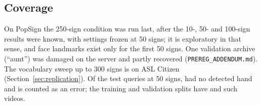 

\subsection{Coverage}
On PopSign the 250-sign condition was run last, after the 10-, 50- and 100-sign results were known, with settings frozen at 50 signs; it is exploratory in that sense, and face landmarks exist only for the first 50 signs. One validation archive (``aunt'') was damaged on the server and partly recovered (\texttt{PREREG\_ADDENDUM.md}). The vocabulary sweep up to 300 signs is on ASL Citizen
(Section~\ref{sec:replication}). Of the \nVideosTest{} test queries at 50 signs,
\nNoHandTest{} had no detected hand and is counted as an error; the training and validation splits have \nNoHandTrain{} and \nNoHandVal{} such videos.
